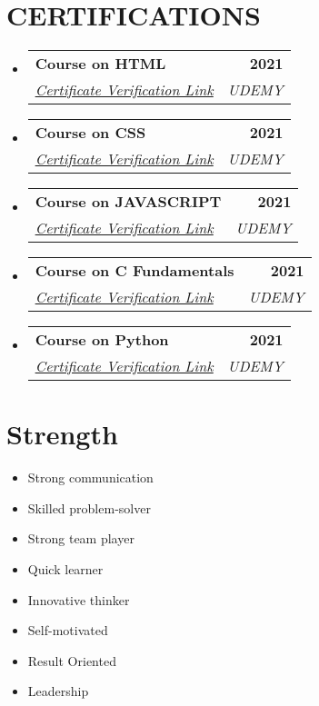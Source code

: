 \documentclass[letterpaper,11pt]{article}
\makeatletter
\newcommand{\resumeSubheading}[4]{
  \vspace{-2pt}\item
    \begin{tabular*}{1.0\textwidth}[t]{l@{\extracolsep{\fill}}r}
      \textbf{#1} & \textbf{\small #2} \\
      \textit{\small#3} & \textit{\small #4} \\
    \end{tabular*}\vspace{-7pt}
}
\newcommand{\resumeSubHeadingListStart}{\begin{itemize}[leftmargin=0.0in, label={}]}
\newcommand{\resumeSubHeadingListEnd}{\end{itemize}}
\makeatother
\begin{document}
\section{CERTIFICATIONS}
\resumeSubHeadingListStart
    \resumeSubheading
      {Course on HTML}{2021}
      {\href{http://ude.my/UC-64198ff3-c0cd-4354-922b-a0c610b02116}{\underline{Certificate Verification Link}}}{UDEMY}
    \resumeSubheading
      {Course on CSS}{2021}
      {\href{http://ude.my/UC-64198ff3-c0cd-4354-922b-a0c610b02116}{\underline{Certificate Verification Link}}}{UDEMY}
    \resumeSubheading
      {Course on JAVASCRIPT}{2021}
      {\href{http://ude.my/UC-64198ff3-c0cd-4354-922b-a0c610b02116}{\underline{Certificate Verification Link}}}{UDEMY}
    \resumeSubheading
      {Course on C Fundamentals}{2021}
      {\href{}{\underline{Certificate Verification Link}}}{UDEMY}
    \resumeSubheading
      {Course on Python}{2021}
      {\href{http://ude.my/UC-3b24818b-b8cd-4e6d-86d4-5f554d9f8580}{\underline{Certificate Verification Link}}}{UDEMY}
\resumeSubHeadingListEnd




\section{Strength}
    \resumeSubHeadingListStart
        \begin{multicols}{4}
            \begin{itemize}[itemsep=-5pt, parsep=3pt]
                \item Strong communication
                \item Skilled problem-solver
                \item Strong team player
                \item Quick learner
                \item Innovative thinker
                \item Self-motivated
                \item Result Oriented 
                \item Leadership
            \end{itemize}
        \end{multicols}
        \vspace*{2.0\multicolsep}
    \resumeSubHeadingListEnd
\end{document}
